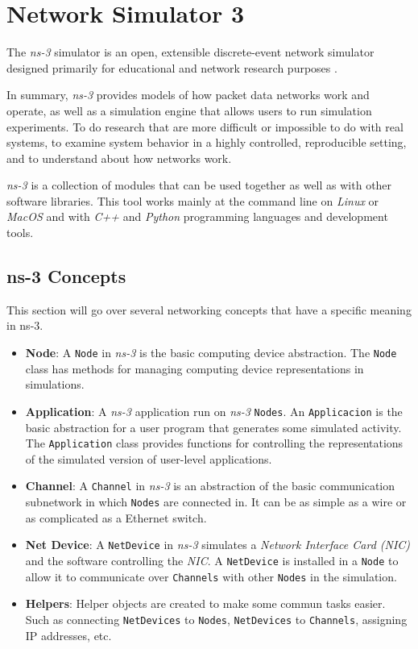 \chapter{Network Simulator 3}
\label{chap:ns3}

The \textit{ns-3} simulator is an open, extensible discrete-event network simulator designed primarily 
for educational and network research purposes \cite{ns3}.

In summary, \textit{ns-3} provides models of how packet data networks work and operate, as well as a 
simulation engine that allows users to run simulation experiments. To do research that are 
more difficult or impossible to do with real systems, to examine system behavior in a highly 
controlled, reproducible setting, and to understand about how networks work.

\textit{ns-3} is a collection of modules that can be used together as well as with other software 
libraries. This tool works mainly at the command line on \textit{Linux} or \textit{MacOS} and with 
\textit{C++} and \textit{Python} programming languages and development tools.

\section{ns-3 Concepts}
\label{sec:ns3conc}
This section will go over several networking concepts that have a specific meaning in ns-3.

\begin{itemize}[topsep=0pt]
  \item[] \textbf{Node}: A \texttt{Node} in \textit{ns-3} is the basic computing device abstraction. 
  The \texttt{Node} class has methods for managing computing device representations in simulations.
  \item[] \textbf{Application}: A \textit{ns-3} application run on \textit{ns-3} \texttt{Nodes}. An 
  \texttt{Applicacion} is the basic abstraction for a user program that generates some simulated activity.  
  The \texttt{Application} class provides functions for controlling the representations of the simulated
  version of user-level applications.
  \item[] \textbf{Channel}: A \texttt{Channel} in \textit{ns-3} is an abstraction of the basic communication 
  subnetwork in which \texttt{Nodes} are connected in. It can be as simple as a wire or as complicated as a Ethernet switch.
  \item[] \textbf{Net Device}: A \texttt{NetDevice} in \textit{ns-3} simulates a \textit{Network Interface Card (NIC)}
  and the software controlling the \textit{NIC}. A \texttt{NetDevice} is installed in a \texttt{Node} to allow 
  it to communicate over \texttt{Channels} with other \texttt{Nodes} in the simulation.
  \item[] \textbf{Helpers}: Helper objects are created to make some commun tasks easier. Such as connecting
  \texttt{NetDevices} to \texttt{Nodes}, \texttt{NetDevices} to \texttt{Channels}, assigning IP addresses, etc. 
\end{itemize}

